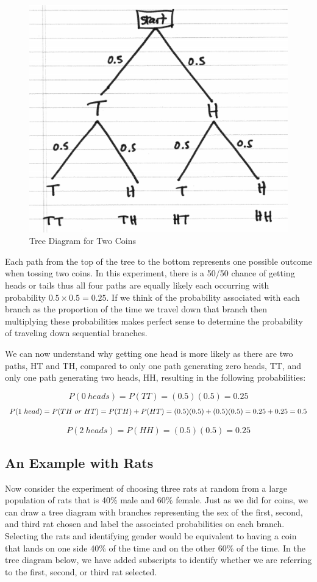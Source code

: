 \documentclass[]{book}
\theoremstyle{definition}
\theoremstyle{definition}
\theoremstyle{definition}
\theoremstyle{remark}
\begin{document}
\begin{figure}

{\centering \includegraphics[width=0.6\linewidth]{01-basics-figures/tree_two_coins} 

}

\caption{Tree Diagram for Two Coins}\label{fig:nice-fig-3}
\end{figure}

Each path from the top of the tree to the bottom represents one possible
outcome when tossing two coins. In this experiment, there is a 50/50
chance of getting heads or tails thus all four paths are equally likely
each occurring with probability \(0.5 \times 0.5 = 0.25\). If we think
of the probability associated with each branch as the proportion of the
time we travel down that branch then multiplying these probabilities
makes perfect sense to determine the probability of traveling down
sequential branches.

We can now understand why getting one head is more likely as there are
two paths, HT and TH, compared to only one path generating zero heads,
TT, and only one path generating two heads, HH, resulting in the
following probabilities:

\[P(0\ heads) = P(TT) = (0.5)(0.5) = 0.25\]
\[\small P(1\ head) = P(TH\ or\ HT) = P(TH) + P(HT) = (0.5)(0.5) + (0.5)(0.5) = 0.25 + 0.25 = 0.5\]

\[P(2\ heads) = P(HH) = (0.5)(0.5) = 0.25\]

\subsection{An Example with Rats}\label{an_example_with_rats}

Now consider the experiment of choosing three rats at random from a
large population of rats that is 40\% male and 60\% female. Just as we
did for coins, we can draw a tree diagram with branches representing the
sex of the first, second, and third rat chosen and label the associated
probabilities on each branch. Selecting the rats and identifying gender
would be equivalent to having a coin that lands on one side 40\% of the
time and on the other 60\% of the time. In the tree diagram below, we
have added subscripts to identify whether we are referring to the first,
second, or third rat selected.
\end{document}
